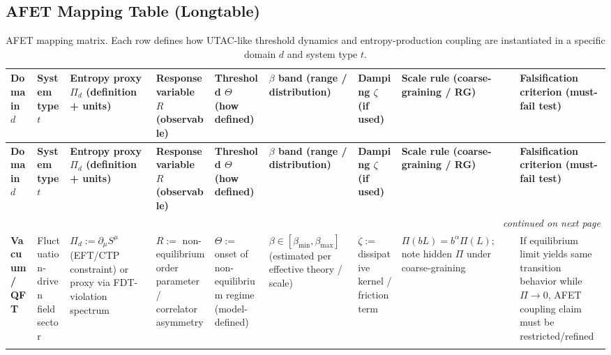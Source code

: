 \subsection{AFET Mapping Table (Longtable)}
\renewcommand{\arraystretch}{1.15}
\setlength{\tabcolsep}{4pt}

\begin{longtable}{p{2.3cm} p{2.6cm} p{3.0cm} p{2.6cm} p{2.2cm} p{2.3cm} p{2.2cm} p{2.6cm} p{3.2cm}}
\caption{AFET mapping matrix. Each row defines how UTAC-like threshold dynamics and entropy-production coupling are instantiated in a specific domain $d$ and system type $t$.} \\
\toprule
\textbf{Domain $d$} &
\textbf{System type $t$} &
\textbf{Entropy proxy $\Pi_d$ (definition + units)} &
\textbf{Response variable $R$ (observable)} &
\textbf{Threshold $\Theta$ (how defined)} &
\textbf{$\beta$ band (range / distribution)} &
\textbf{Damping $\zeta$ (if used)} &
\textbf{Scale rule (coarse-graining / RG)} &
\textbf{Falsification criterion (must-fail test)} \\
\midrule
\endfirsthead

\toprule
\textbf{Domain $d$} &
\textbf{System type $t$} &
\textbf{Entropy proxy $\Pi_d$ (definition + units)} &
\textbf{Response variable $R$ (observable)} &
\textbf{Threshold $\Theta$ (how defined)} &
\textbf{$\beta$ band (range / distribution)} &
\textbf{Damping $\zeta$ (if used)} &
\textbf{Scale rule (coarse-graining / RG)} &
\textbf{Falsification criterion (must-fail test)} \\
\midrule
\endhead

\midrule
\multicolumn{9}{r}{\emph{continued on next page}} \\
\endfoot

\bottomrule
\endlastfoot


\textbf{Vacuum / QFT} &
Fluctuation-driven field sector &
$\Pi_d := \partial_\mu S^\mu$ (EFT/CTP constraint) or proxy via FDT-violation spectrum &
$R :=$ non-equilibrium order parameter / correlator asymmetry &
$\Theta :=$ onset of non-equilibrium regime (model-defined) &
$\beta \in [\beta_{\min},\beta_{\max}]$ (estimated per effective theory / scale) &
$\zeta :=$ dissipative kernel / friction term &
$\Pi(bL)=b^{\alpha}\Pi(L)$; note hidden $\Pi$ under coarse-graining &
If equilibrium limit yields same transition behavior while $\Pi \to 0$, AFET coupling claim must be restricted/refined \\
\\


\end{longtable}
